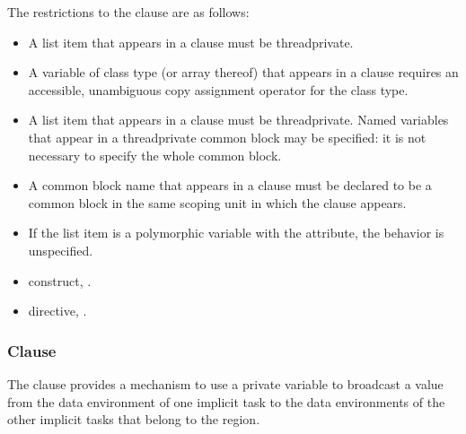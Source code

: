 \restrictions
The restrictions to the  clause are as follows:

\begin{ccppspecific}
\begin{itemize}
\item A list item that appears in a  clause must be threadprivate.
\item A variable of class type (or array thereof) that appears in a  
      clause requires an accessible, unambiguous copy assignment operator for the 
      class type.
\end{itemize}
\end{ccppspecific}

\begin{fortranspecific}
\begin{itemize}
\item A list item that appears in a  clause must be threadprivate. 
      Named variables that appear in a threadprivate common block may be specified: 
      it is not necessary to specify the whole common block.
\item A common block name that appears in a  clause must be declared 
      to be a common block in the same scoping unit in which the  
      clause appears.
\item If the list item is a polymorphic variable with the  
      attribute, the behavior is unspecified.
\end{itemize}
\end{fortranspecific}

\crossreferences
\begin{itemize}
\item {} construct,
.

\item {} directive,
.
\end{itemize}



\subsubsection{ Clause}
\label{subsubsec:copyprivate clause}
\summary
The  clause provides a mechanism to use a private variable 
to broadcast a value from the data environment of one implicit task to the data 
environments of the other implicit tasks that belong to the  region.

